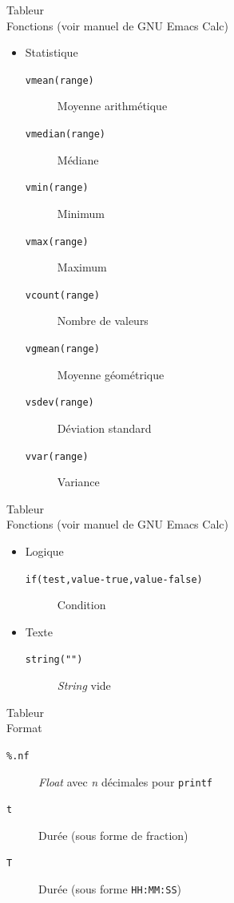 \documentclass[presentation,t,hideothersubsections]{beamer}
\begin{document}
\begin{frame}[fragile,label=sec-3-3-10]{Tableur \\ Fonctions (voir manuel de GNU Emacs Calc)}
 \begin{itemize}
\item Statistique
\begin{description}
\item[\texttt{vmean(range)}] Moyenne arithmétique
\item[\texttt{vmedian(range)}] Médiane
\item[\texttt{vmin(range)}] Minimum
\item[\texttt{vmax(range)}] Maximum
\item[\texttt{vcount(range)}] Nombre de valeurs
\item[\texttt{vgmean(range)}] Moyenne géométrique
\item[\texttt{vsdev(range)}] Déviation standard
\item[\texttt{vvar(range)}] Variance
\end{description}
\end{itemize}
\end{frame}
\begin{frame}[fragile,label=sec-3-3-11]{Tableur \\ Fonctions (voir manuel de GNU Emacs Calc)}
 \begin{itemize}
\item Logique
\begin{description}
\item[\texttt{if(test,value-true,value-false)}] Condition
\end{description}

\item Texte
\begin{description}
\item[\texttt{string("")}] \emph{String} vide
\end{description}
\end{itemize}
\end{frame}
\begin{frame}[fragile,label=sec-3-3-12]{Tableur \\ Format}
 \begin{description}
\item[\texttt{\%.nf}] \emph{Float} avec \emph{n} décimales pour \texttt{printf}
\item[\texttt{t}] Durée (sous forme de fraction)
\item[\texttt{T}] Durée (sous forme \texttt{HH:MM:SS})
\end{description}
\end{frame}
\end{document}

